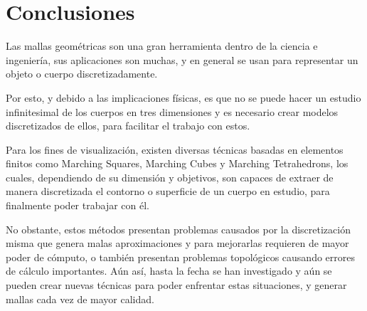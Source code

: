\section{Conclusiones}
\label{ch:conclusiones}

Las mallas geométricas son una gran herramienta dentro de la ciencia e ingeniería, sus 
aplicaciones son muchas, y en general se usan para representar un objeto o cuerpo 
discretizadamente.

Por esto, y debido a las implicaciones físicas, es que no se puede hacer un estudio 
infinitesimal de los cuerpos en tres dimensiones y es necesario crear modelos discretizados de 
ellos, para facilitar el trabajo con estos.

Para los fines de visualización, existen diversas técnicas basadas en elementos finitos 
como Marching Squares, Marching Cubes y Marching Tetrahedrons, los cuales, dependiendo de 
su dimensión y objetivos, son capaces de extraer de manera discretizada el contorno o superficie 
de un cuerpo en estudio, para finalmente poder trabajar con él.

No obstante, estos métodos presentan problemas causados por la discretización misma que 
genera malas aproximaciones y para mejorarlas requieren de mayor poder de cómputo, o también 
presentan problemas topológicos causando errores de cálculo importantes. Aún así, hasta la fecha 
se han investigado y aún se pueden crear nuevas técnicas para poder enfrentar estas situaciones, y 
generar mallas cada vez de mayor calidad.
